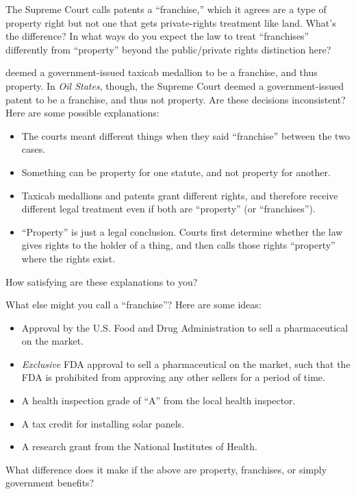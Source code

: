 \item The Supreme Court calls patents a ``franchise,'' which it agrees are a
type of property right but not one that gets private-rights treatment like land.
What's the difference? In what ways do you expect the law to treat
``franchises'' differently from ``property'' beyond the public/private rights
distinction here?

\item
{} deemed a government-issued taxicab
medallion to be a franchise, and thus property. In \emph{Oil States}, though,
the Supreme Court deemed a government-issued patent to be a franchise, and thus
not property. Are these decisions inconsistent? Here are some possible
explanations:
\begin{itemize}
\item The courts meant different things when they said ``franchise'' between the
two cases.
\item Something can be property for one statute, and not property for another.
\item Taxicab medallions and patents grant different rights, and therefore
receive different legal treatment even if both are ``property'' (or
``franchises'').
\item ``Property'' is just a legal conclusion. Courts first determine whether
the law gives rights to the holder of a thing, and then calls those rights
``property'' where the rights exist.
\end{itemize}
How satisfying are these explanations to you?

\item What else might you call a ``franchise''? Here are some ideas:
\begin{itemize}
\item Approval by the U.S. Food and Drug Administration to sell a pharmaceutical
on the market.

\item \emph{Exclusive} FDA approval to sell a pharmaceutical on the market, such
that the FDA is prohibited from approving any other sellers for a period of
time.

\item A health inspection grade of ``A'' from the local health inspector.

\item A tax credit for installing solar panels.

\item A research grant from the National Institutes of Health.
\end{itemize}
What difference does it make if the above are property, franchises, or simply
government benefits?

